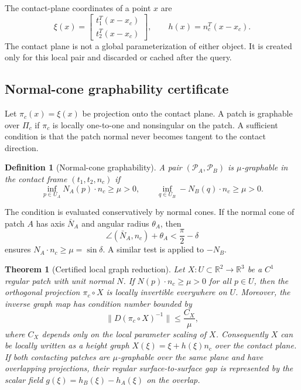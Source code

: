 \documentclass[preprint,12pt]{elsarticle}
\newtheorem{definition}{Definition}
\newtheorem{theorem}{Theorem}
\newcommand{\R}{\mathbb{R}}
\newcommand{\Pc}{\mathcal{P}}
\begin{document}
The contact-plane coordinates of a point $x$ are
\begin{equation}
    \xi(x)=
    \begin{bmatrix}
    t_1^T(x-x_c)\\[2pt]
    t_2^T(x-x_c)
    \end{bmatrix},
    \qquad
    h(x)=n_c^T(x-x_c).
    \label{eq:projection_height}
\end{equation}
The contact plane is not a global parameterization of either object. It is created only for this local pair and discarded or cached after the query.

\subsection{Normal-cone graphability certificate}
\label{subsec:certificate}

Let $\pi_c(x)=\xi(x)$ be projection onto the contact plane. A patch is graphable over $\Pi_c$ if $\pi_c$ is locally one-to-one and nonsingular on the patch. A sufficient condition is that the patch normal never becomes tangent to the contact direction.

\begin{definition}[Normal-cone graphability]
A pair $(\Pc_A,\Pc_B)$ is $\mu$-graphable in the contact frame $(t_1,t_2,n_c)$ if
\begin{equation}
    \inf_{p\in U_A} N_A(p)\cdot n_c\ge \mu>0,
    \qquad
    \inf_{q\in U_B} -N_B(q)\cdot n_c\ge \mu>0.
    \label{eq:mu_graphability}
\end{equation}
\end{definition}

The condition is evaluated conservatively by normal cones. If the normal cone of patch $A$ has axis $\bar N_A$ and angular radius $\theta_A$, then
\begin{equation}
    \angle(\bar N_A,n_c)+\theta_A < \frac{\pi}{2}-\delta
    \label{eq:cone_test_a}
\end{equation}
ensures $N_A\cdot n_c\ge \mu=\sin\delta$. A similar test is applied to $-N_B$.

\begin{theorem}[Certified local graph reduction]
\label{thm:graph_reduction}
Let $X:U\subset\R^2\rightarrow\R^3$ be a $C^1$ regular patch with unit normal $N$. If $N(p)\cdot n_c\ge \mu>0$ for all $p\in U$, then the orthogonal projection $\pi_c\circ X$ is locally invertible everywhere on $U$. Moreover, the inverse graph map has condition number bounded by
\begin{equation}
    \|D(\pi_c\circ X)^{-1}\|\le \frac{C_X}{\mu},
    \label{eq:inverse_condition_bound}
\end{equation}
where $C_X$ depends only on the local parameter scaling of $X$. Consequently $X$ can be locally written as a height graph $X(\xi)=\xi+h(\xi)n_c$ over the contact plane. If both contacting patches are $\mu$-graphable over the same plane and have overlapping projections, their regular surface-to-surface gap is represented by the scalar field $g(\xi)=h_B(\xi)-h_A(\xi)$ on the overlap.
\end{theorem}
\end{document}
